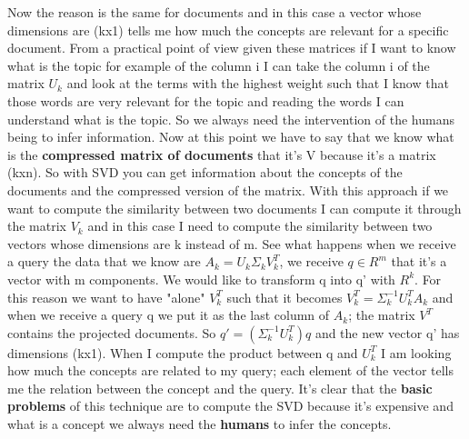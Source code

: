 Now the reason is the same for documents and in this case a vector whose dimensions are (kx1) tells me how much the concepts are relevant for a specific document.\newline
From a practical point of view given these matrices if I want to know what is the topic for example of the column i I can take the column i of the matrix $U_k$ and look at the terms with the highest weight such that I know that those words are very relevant for the topic and reading the words I can understand what is the topic. So we always need the intervention of the humans being to infer information.\newline
Now at this point we have to say that we know what is the \textbf{compressed matrix of documents} that it's V because it's a matrix (kxn). So with SVD you can get information about the concepts of the documents and the compressed version of the matrix.\newline
With this approach if we want to compute the similarity between two documents I can compute it through the matrix $V_k$ and in this case I need to compute the similarity between two vectors whose dimensions are k instead of m.\newline
See what happens when we receive a query the data that we know are $A_k=U_k\Sigma_kV_k^T$, we receive $q \in R^m$ that it's a vector with m components. We would like to transform q into q' with $R^k$. For this reason we want to have "alone" $V_k^T$ such that it becomes $V_k^T=\Sigma_k^{-1}U_k^TA_k$ and when we receive a query q we put it as the last column of $A_k$; the matrix $V^T$ contains the projected documents. So $q'=(\Sigma_k^{-1}U_k^T)q$ and the new vector q' has dimensions (kx1).\newline
When I compute the product between q and $U_k^T$ I am looking how much the concepts are related to my query; each element of the vector tells me the relation between the concept and the query.\newline
It's clear that the \textbf{basic problems} of this technique are to compute the SVD because it's expensive and what is a concept we always need the \textbf{humans} to infer the concepts.\newline


